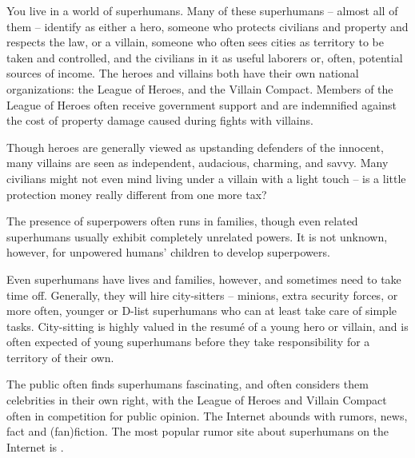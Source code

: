 \documentclass[blue]{LRSguildcamp1}
\begin{document}
\name{\bWorld{}}
You live in a world of superhumans.  Many of these superhumans -- almost all of them -- identify as either a hero, someone who protects civilians and property and respects the law, or a villain, someone who often sees cities as territory to be taken and controlled, and the civilians in it as useful laborers or, often, potential sources of income.  The heroes and villains both have their own national organizations: the League of Heroes, and the Villain Compact.  Members of the League of Heroes often receive government support and are indemnified against the cost of property damage caused during fights with villains.

Though heroes are generally viewed as upstanding defenders of the innocent, many villains are seen as independent, audacious, charming, and savvy.  Many civilians might not even mind living under a villain with a light touch -- is a little protection money really different from one more tax?

The presence of superpowers often runs in families, though even related superhumans usually exhibit completely unrelated powers.  It is not unknown, however, for unpowered humans' children to develop superpowers.

Even superhumans have lives and families, however, and sometimes need to take time off.  Generally, they will hire city-sitters -- minions, extra security forces, or more often, younger or D-list superhumans who can at least take care of simple tasks.  City-sitting is highly valued in the resum\'e of a young hero or villain, and is often expected of young superhumans before they take responsibility for a territory of their own.

The public often finds superhumans fascinating, and often considers them celebrities in their own right, with the League of Heroes and Villain Compact often in competition for public opinion.  The Internet abounds with rumors, news, fact and (fan)fiction.  The most popular rumor site about superhumans on the Internet is \pTweenwebsite{}.
\end{document}

